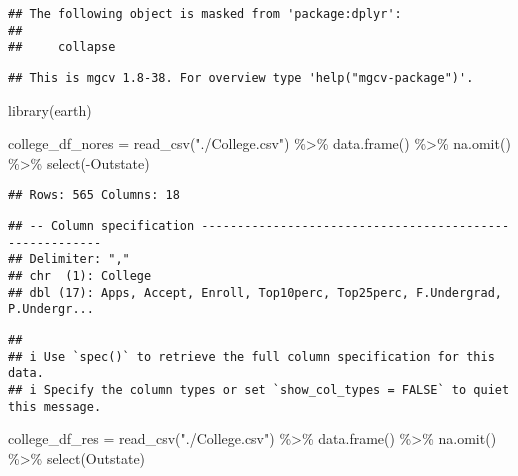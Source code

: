 \documentclass[
]{article}
\newenvironment{Shaded}{\begin{snugshade}}{\end{snugshade}}
\newcommand{\FunctionTok}[1]{\textcolor[rgb]{0.00,0.00,0.00}{#1}}
\newcommand{\NormalTok}[1]{#1}
\newcommand{\OtherTok}[1]{\textcolor[rgb]{0.56,0.35,0.01}{#1}}
\newcommand{\SpecialCharTok}[1]{\textcolor[rgb]{0.00,0.00,0.00}{#1}}
\newcommand{\StringTok}[1]{\textcolor[rgb]{0.31,0.60,0.02}{#1}}
\begin{document}
\begin{verbatim}
## The following object is masked from 'package:dplyr':
## 
##     collapse
\end{verbatim}

\begin{verbatim}
## This is mgcv 1.8-38. For overview type 'help("mgcv-package")'.
\end{verbatim}

\begin{Shaded}
\begin{Highlighting}[]
\FunctionTok{library}\NormalTok{(earth)}
\end{Highlighting}
\end{Shaded}

\begin{Shaded}
\begin{Highlighting}[]
\NormalTok{college\_df\_nores }\OtherTok{=} \FunctionTok{read\_csv}\NormalTok{(}\StringTok{"./College.csv"}\NormalTok{) }\SpecialCharTok{\%\textgreater{}\%} 
  \FunctionTok{data.frame}\NormalTok{() }\SpecialCharTok{\%\textgreater{}\%} 
  \FunctionTok{na.omit}\NormalTok{() }\SpecialCharTok{\%\textgreater{}\%} 
  \FunctionTok{select}\NormalTok{(}\SpecialCharTok{{-}}\NormalTok{Outstate)}
\end{Highlighting}
\end{Shaded}

\begin{verbatim}
## Rows: 565 Columns: 18
\end{verbatim}

\begin{verbatim}
## -- Column specification --------------------------------------------------------
## Delimiter: ","
## chr  (1): College
## dbl (17): Apps, Accept, Enroll, Top10perc, Top25perc, F.Undergrad, P.Undergr...
\end{verbatim}

\begin{verbatim}
## 
## i Use `spec()` to retrieve the full column specification for this data.
## i Specify the column types or set `show_col_types = FALSE` to quiet this message.
\end{verbatim}

\begin{Shaded}
\begin{Highlighting}[]
\NormalTok{college\_df\_res }\OtherTok{=} \FunctionTok{read\_csv}\NormalTok{(}\StringTok{"./College.csv"}\NormalTok{) }\SpecialCharTok{\%\textgreater{}\%} 
  \FunctionTok{data.frame}\NormalTok{() }\SpecialCharTok{\%\textgreater{}\%} 
  \FunctionTok{na.omit}\NormalTok{() }\SpecialCharTok{\%\textgreater{}\%} 
  \FunctionTok{select}\NormalTok{(Outstate)}
\end{Highlighting}
\end{Shaded}
\end{document}

